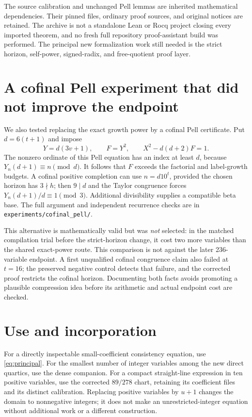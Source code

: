 \documentclass[11pt]{article}
\theoremstyle{definition}
\begin{document}
The source calibration and unchanged Pell lemmas are inherited
mathematical dependencies. Their pinned files, ordinary proof
sources, and original notices are retained. The archive is not a
standalone Lean or Rocq project closing every imported theorem,
and no fresh full repository proof-assistant build was performed.
The principal new formalization work still needed is the strict
horizon, self-power, signed-radix, and free-quotient proof layer.



\section{A cofinal Pell experiment that did not improve the endpoint}
\label{sec:experiment}

We also tested replacing the exact growth power by a cofinal Pell
certificate. Put $d=6(t+1)$ and impose
\[
Y=d(3v+1),\qquad F=Y^2,\qquad
X^2-d(d+2)F=1.
\]
The nonzero ordinate of this Pell equation has an index at least $d$,
because $Y_n(d+1)\equiv n\pmod d$. It follows that $F$ exceeds
the factorial and label-growth budgets. A cofinal positive completion
can use $n=d10^t$, provided the chosen horizon has $3\nmid h$;
then $9\mid d$ and the Taylor congruence forces
$Y_n(d+1)/d\equiv1\pmod3$. Additional divisibility supplies a
compatible beta base. The full argument and independent recurrence
checks are in \nolinkurl{experiments/cofinal_pell/}.

This alternative is mathematically valid but was \emph{not} selected:
in the matched compilation trial before the strict-horizon change,
it cost two more variables than the shared exact-power route.
This comparison is not against the later 236-variable endpoint.
A first unqualified cofinal congruence claim also
failed at $t=16$; the preserved negative control detects that failure,
and the corrected proof restricts the cofinal horizon. Documenting
both facts avoids promoting a plausible compression idea before its
arithmetic and actual endpoint cost are checked.

\section{Use and incorporation}

For a directly inspectable small-coefficient consistency equation,
use \eqref{eq:principal}. For the smallest number of integer variables
among the new direct quartics, use the dense companion. For a compact
straight-line expression in ten positive variables, use the corrected
$89/278$ chart, retaining its coefficient files and its distinct
calibration. Replacing positive variables by $u+1$ changes the domain
to nonnegative integers; it does not make an unrestricted-integer
equation without additional work or a different construction.
\end{document}
